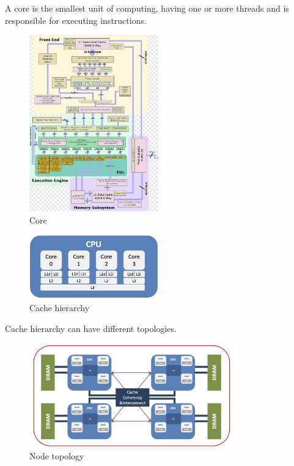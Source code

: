 \begin{minipage}{0.45\textwidth}
    A core is the smallest unit of computing, having one or more threads and is responsible for executing instructions. 
    \begin{figure}[H]
        \centering
        \includegraphics[width=0.5\textwidth]{assets/fig7.png}
        \caption{Core}
        \label{fig:core}
    \end{figure}
\end{minipage}
\begin{minipage}{0.45\textwidth}
    \begin{figure}[H]
        \centering
        \includegraphics[width=0.5\textwidth]{assets/fig8.png}
        \caption{Cache hierarchy}
        \label{fig:cache_hierarchy}
    \end{figure}
    Cache hierarchy can have different topologies.
\end{minipage}

\begin{figure}[H]
    \centering
    \includegraphics[width=0.8\textwidth]{assets/fig9.png}
    \caption{Node topology}
    \label{fig:node_topology}
\end{figure}

